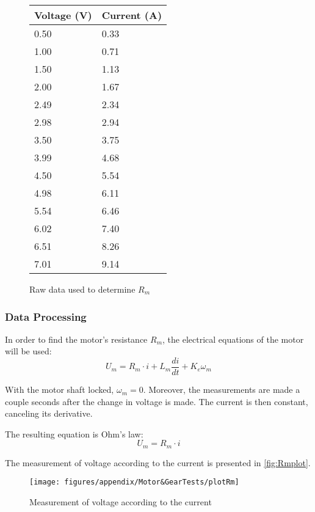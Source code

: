\begin{figure}[htbp]
	\centering
	\caption{Raw data used to determine $R_m$}\label{tab_appendix:RmData}
	\begin{tabularx}{0.35\textwidth}{XX}
		Voltage (V) & Current (A)\\ \toprule \rowcolor{lightGrey}
		0.50 & 0.33 \\
		1.00 & 0.71 \\ \rowcolor{lightGrey}
		1.50 & 1.13 \\
		2.00 & 1.67 \\ \rowcolor{lightGrey}
		2.49 & 2.34 \\
		2.98 & 2.94 \\ \rowcolor{lightGrey}
		3.50 & 3.75 \\
		3.99 & 4.68 \\ \rowcolor{lightGrey}
		4.50 & 5.54 \\
		4.98 & 6.11 \\ \rowcolor{lightGrey}
		5.54 & 6.46 \\
		6.02 & 7.40 \\ \rowcolor{lightGrey}
		6.51 & 8.26 \\
		7.01 & 9.14 
	\end{tabularx}
\end{figure}

\subsubsection{Data Processing}
In order to find the motor's resistance $R_m$, the electrical equations of the motor will be used:
\begin{equation}
	U_m = R_m \cdot i + L_m \frac{di}{dt} + K_e\omega_m
\end{equation}

With the motor shaft locked, $\omega_m = 0$. Moreover, the measurements are made a couple seconds after the change in voltage is made. The current is then constant, canceling its derivative. 

The resulting equation is Ohm's law:
\begin{equation}
U_m = R_m \cdot i
\end{equation}


The measurement of voltage according to the current is presented in \autoref{fig:Rmplot}.
\begin{figure}[htbp]
	\texttt{[image: figures/appendix/Motor\&GearTests/plotRm]}
	\caption{Measurement of voltage according to the current} \label{fig:Rmplot}
\end{figure}

